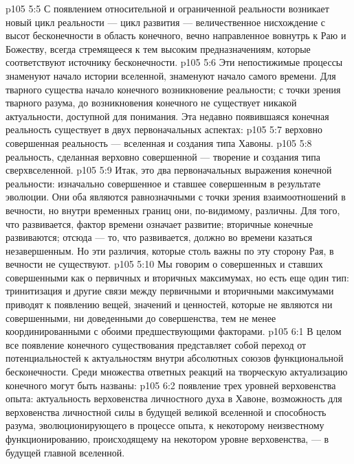 \vs p105 5:5 С появлением относительной и ограниченной реальности возникает новый цикл реальности --- цикл развития --- величественное нисхождение с высот бесконечности в область конечного, вечно направленное вовнутрь к Раю и Божеству, всегда стремящееся к тем высоким предназначениям, которые соответствуют источнику бесконечности.
\vs p105 5:6 Эти непостижимые процессы знаменуют начало истории вселенной, знаменуют начало самого времени. Для тварного существа начало конечного  возникновение реальности; с точки зрения тварного разума, до возникновения конечного не существует никакой актуальности, доступной для понимания. Эта недавно появившаяся конечная реальность существует в двух первоначальных аспектах:
\vs p105 5:7 \bibnobreakspace {} верховно совершенная реальность --- вселенная и создания типа Хавоны.
\vs p105 5:8 \bibnobreakspace {} реальность, сделанная верховно совершенной --- творение и создания типа сверхвселенной.
\vs p105 5:9 \pc Итак, это два первоначальных выражения конечной реальности: изначально совершенное и ставшее совершенным в результате эволюции. Они оба являются равнозначными с точки зрения взаимоотношений в вечности, но внутри временных границ они, по\hyp{}видимому, различны. Для того, что развивается, фактор времени означает развитие; вторичные конечные развиваются; отсюда --- то, что развивается, должно во времени казаться незавершенным. Но эти различия, которые столь важны по эту сторону Рая, в вечности не существуют.
\vs p105 5:10 Мы говорим о совершенных и ставших совершенными как о первичных и вторичных максимумах, но есть еще один тип: тринитизация и другие связи между первичными и вторичными максимумами приводят к появлению  вещей, значений и ценностей, которые не являются ни совершенными, ни доведенными до совершенства, тем не менее координированными с обоими предшествующими факторами.
\vs p105 6:1 В целом все появление конечного существования представляет собой переход от потенциальностей к актуальностям внутри абсолютных союзов функциональной бесконечности. Среди множества ответных реакций на творческую актуализацию конечного могут быть названы:
\vs p105 6:2 \bibnobreakspace {} появление трех уровней верховенства опыта: актуальность верховенства личностного духа в Хавоне, возможность для верховенства личностной силы в будущей великой вселенной и способность разума, эволюционирующего в процессе опыта, к некоторому неизвестному функционированию, происходящему на некотором уровне верховенства, --- в будущей главной вселенной.
